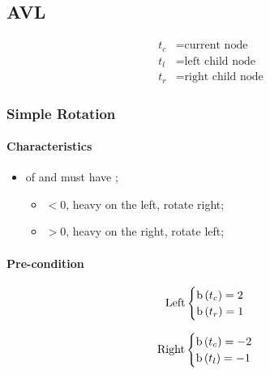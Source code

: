 \subsection{AVL}

  \begin{align*}
    t_{c} &= \text{current node} \\ 
    t_{l} &= \text{left child node} \\ 
    t_{r} &= \text{right child node}
  \end{align*}

  \subsubsection{Simple Rotation}
  
    \paragraph{Characteristics}
    \begin{itemize}
      \item {} of  and  must have ;
      \begin{itemize}
        \item $ < 0 $, heavy on the left, rotate right;
        \item $ > 0 $, heavy on the right, rotate left;
      \end{itemize}
    \end{itemize}
    
    \paragraph{Pre-condition}
  
    \begin{equation}
      \text{Left}
      \begin{cases}
        \operatorname{b} \left( t_{c} \right) = 2 \\ 
        \operatorname{b} \left( t_{r} \right) = 1 
      \end{cases}
    \end{equation}
    
    \begin{equation}
      \text{Right}
      \begin{cases}
        \operatorname{b} \left( t_{c} \right) = -2 \\ 
        \operatorname{b} \left( t_{l} \right) = -1 
      \end{cases}
    \end{equation}
    
